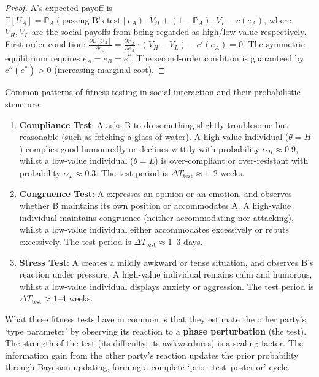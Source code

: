 \begin{proof}
A's expected payoff is $\mathbb{E}[U_A] = \mathbb{P}_A(\text{passing B's test} \mid e_A) \cdot V_H + (1 - \mathbb{P}_A) \cdot V_L - c(e_A)$, where $V_H, V_L$ are the social payoffs from being regarded as high/low value respectively. First-order condition: $\frac{\partial \mathbb{E}[U_A]}{\partial e_A} = \frac{\partial \mathbb{P}_A}{\partial e_A} \cdot (V_H - V_L) - c'(e_A) = 0$. The symmetric equilibrium requires $e_A = e_B = e^*$. The second-order condition is guaranteed by $c''(e^*) > 0$ (increasing marginal cost).
\end{proof}

\begin{example}
Common patterns of fitness testing in social interaction and their probabilistic structure:
\begin{enumerate}[label=(\roman*)]
    \item \textbf{Compliance Test}: A asks B to do something slightly troublesome but reasonable (such as fetching a glass of water). A high-value individual ($\theta = H$) complies good-humouredly or declines wittily with probability $\alpha_H \approx 0.9$, whilst a low-value individual ($\theta = L$) is over-compliant or over-resistant with probability $\alpha_L \approx 0.3$. The test period is $\Delta T_{\text{test}} \approx 1$--$2$ weeks.
    \item \textbf{Congruence Test}: A expresses an opinion or an emotion, and observes whether B maintains its own position or accommodates A. A high-value individual maintains congruence (neither accommodating nor attacking), whilst a low-value individual either accommodates excessively or rebuts excessively. The test period is $\Delta T_{\text{test}} \approx 1$--$3$ days.
    \item \textbf{Stress Test}: A creates a mildly awkward or tense situation, and observes B's reaction under pressure. A high-value individual remains calm and humorous, whilst a low-value individual displays anxiety or aggression. The test period is $\Delta T_{\text{test}} \approx 1$--$4$ weeks.
\end{enumerate}
What these fitness tests have in common is that they estimate the other party's `type parameter' by observing its reaction to a \textbf{phase perturbation} (the test). The strength of the test (its difficulty, its awkwardness) is a scaling factor. The information gain from the other party's reaction updates the prior probability through Bayesian updating, forming a complete `prior--test--posterior' cycle.
\end{example}

